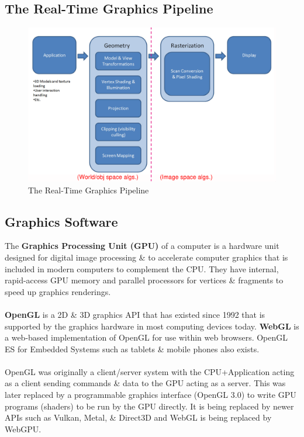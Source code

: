 \documentclass[a4paper,11pt]{article}
\begin{document}
\subsection{The Real-Time Graphics Pipeline}
\begin{figure}[H]
    \centering
    \includegraphics[width=\textwidth]{images/real_time_graphics_pipeline.png}
    \caption{The Real-Time Graphics Pipeline}
\end{figure}

\subsection{Graphics Software}
The \textbf{Graphics Processing Unit (GPU)} of a computer is a hardware unit designed for digital image processing \& to 
accelerate computer graphics that is included in modern computers to complement the CPU.
They have internal, rapid-access GPU memory and parallel processors for vertices \& fragments to speed up graphics 
renderings.
\\\\
\textbf{OpenGL} is a 2D \& 3D graphics API that has existed since 1992 that is supported by the graphics hardware in most
computing devices today.
\textbf{WebGL} is a web-based implementation of OpenGL for use within web browsers.
OpenGL ES for Embedded Systems such as tablets \& mobile phones also exists.
\\\\
OpenGL was originally a client/server system with the CPU+Application acting as a client sending commands \& data to the GPU
acting as a server.
This was later replaced by a programmable graphics interface (OpenGL 3.0) to write GPU programs (shaders) to be run by the 
GPU directly.
It is being replaced by newer APIs such as Vulkan, Metal, \& Direct3D and WebGL is being replaced by WebGPU.
\end{document}
